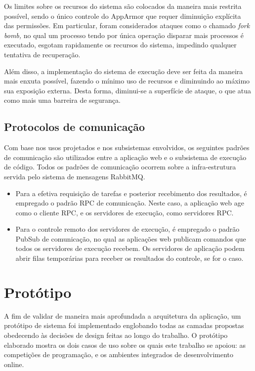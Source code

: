 \documentclass[ruledheader, 12pt]{abnt}
\begin{document}
Os limites sobre os recursos do sistema são colocados da maneira mais restrita possível, sendo o único controle do AppArmor que requer diminuição explícita das permissões. Em particular, foram considerados ataques como o chamado \emph{fork bomb,} no qual um processo tendo por única operação disparar mais processos é executado, esgotam rapidamente os recursos do sistema, impedindo qualquer tentativa de recuperação.

Além disso, a implementação do sistema de execução deve ser feita da maneira mais enxuta possível, fazendo o mínimo uso de recursos e diminuindo ao máximo sua exposição externa. Desta forma, diminui-se a superfície de ataque, o que atua como mais uma barreira de segurança.

\subsection{Protocolos de comunicação}

Com base nos usos projetados e nos subsistemas envolvidos, os seguintes padrões de comunicação são utilizados entre a aplicação web e o subsistema de execução de código. Todos os padrões de comunicação ocorrem sobre a infra-estrutura servida pelo sistema de mensagens RabbitMQ.
\begin{itemize}
	\item Para a efetiva requisição de tarefas e posterior recebimento dos resultados, é empregado o padrão RPC de comunicação. Neste caso, a aplicação web age como o cliente RPC, e os servidores de execução, como servidores RPC.
	
	\item Para o controle remoto dos servidores de execução, é empregado o padrão PubSub de comunicação, no qual as aplicações web publicam comandos que todos os servidores de execução recebem. Os servidores de aplicação podem abrir filas temporárias para receber os resultados do controle, se for o caso.
\end{itemize}

\section{Protótipo}

A fim de validar de maneira mais aprofundada a arquitetura da aplicação, um protótipo de sistema foi implementado englobando todas as camadas propostas obedecendo às decisões de design feitas ao longo do trabalho. O protótipo elaborado mostra os dois casos de uso sobre os quais este trabalho se apoiou: as competições de programação, e os ambientes integrados de desenvolvimento online.
\end{document}
